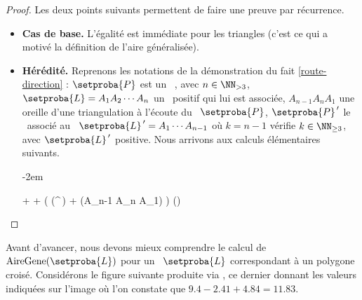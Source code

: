 \begin{proof}
    Les deux points suivants permettent de faire une preuve par récurrence.

    \begin{itemize}
		\item \textbf{Cas de base.}
		L'égalité est immédiate pour les triangles (c'est ce qui a motivé la définition de l'aire généralisée).


		\item \textbf{Hérédité.}
		Reprenons les notations de la démonstration du fait \ref{route-direction} : $\setproba{P}$ est un \ngone\ , avec $n \in \NN_{>3}$, $\setproba{L} = A_1 A_2 \cdots A_n$ un \ncycle\ positif qui lui est associée, $A_{n-1} A_n A_1$ une oreille d'une triangulation à l'écoute du \ngone\ $\setproba{P}$, $\setproba{P}^{\,\prime}$ le \kgone\ associé au \kcycle\ $\setproba{L}^{\,\prime} = A_1 \cdots A_{n-1}$ où $k = n-1$ vérifie $k \in \NN_{\geq3}$, avec $\setproba{L}^{\,\prime}$ positive. Nous arrivons aux calculs élémentaires suivants.
		
		\newpage
		
		\leavevmode\kern-2em%
		\begin{stepcalc}[style=ar*]
		          {}
		     + 
		          {}
		     + 
		          {}
		     \big( \mu(^{\,\prime}) + \mu(A_{n-1} A_n A_1) \big)
		          {}
		     \mu()
		          {}
		\end{stepcalc}
    \end{itemize}
\end{proof}





Avant d'avancer, nous devons mieux comprendre le calcul de $\garea{\setproba{L}}$ pour un \ncycle\ $\setproba{L}$ correspondant à un polygone croisé.
Considérons le figure suivante produite via \geogebra, ce dernier donnant les valeurs indiquées sur l'image où l'on constate que $\num{9.4} - \num{2.41} + \num{4.84} = \num{11.83}$.



